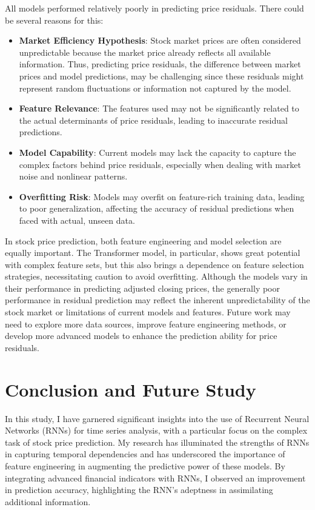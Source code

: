 \documentclass[10pt,twocolumn,letterpaper]{article}
\begin{document}
All models performed relatively poorly in predicting price residuals. There could be several reasons for this:
\begin{itemize}
    \item \textbf{Market Efficiency Hypothesis}: Stock market prices are often considered unpredictable because the market price already reflects all available information. Thus, predicting price residuals, the difference between market prices and model predictions, may be challenging since these residuals might represent random fluctuations or information not captured by the model.
    
    \item \textbf{Feature Relevance}: The features used may not be significantly related to the actual determinants of price residuals, leading to inaccurate residual predictions.
    
    \item \textbf{Model Capability}: Current models may lack the capacity to capture the complex factors behind price residuals, especially when dealing with market noise and nonlinear patterns.
    
    \item \textbf{Overfitting Risk}: Models may overfit on feature-rich training data, leading to poor generalization, affecting the accuracy of residual predictions when faced with actual, unseen data.
\end{itemize}

In stock price prediction, both feature engineering and model selection are equally important. The Transformer model, in particular, shows great potential with complex feature sets, but this also brings a dependence on feature selection strategies, necessitating caution to avoid overfitting. Although the models vary in their performance in predicting adjusted closing prices, the generally poor performance in residual prediction may reflect the inherent unpredictability of the stock market or limitations of current models and features. Future work may need to explore more data sources, improve feature engineering methods, or develop more advanced models to enhance the prediction ability for price residuals.

\section{Conclusion and Future Study}
\label{sec:cfs}
In this study, I have garnered significant insights into the use of Recurrent Neural Networks (RNNs) for time series analysis, with a particular focus on the complex task of stock price prediction. My research has illuminated the strengths of RNNs in capturing temporal dependencies and has underscored the importance of feature engineering in augmenting the predictive power of these models. By integrating advanced financial indicators with RNNs, I observed an improvement in prediction accuracy, highlighting the RNN's adeptness in assimilating additional information.
\end{document}
